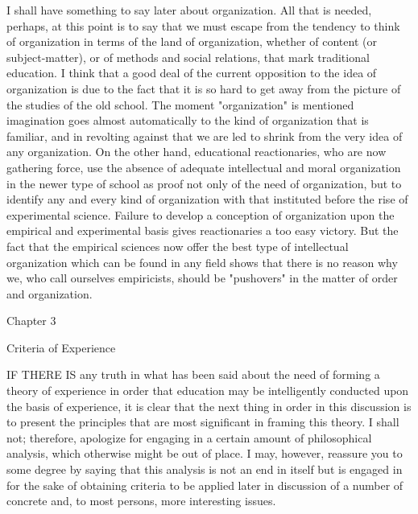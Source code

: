 I shall have something to say later about organization. All that is needed, perhaps, at 
this point is to say that we must escape from the tendency to think of organization in 
terms of the land of organization, whether of content (or subject-matter), or of methods 
and social relations, that mark traditional education. I think that a good deal of the current 
opposition to the idea of organization is due to the fact that it is so hard to get away from 
the picture of the studies of the old school. The moment "organization" is mentioned 
imagination goes almost automatically to the kind of organization that is familiar, and in 
revolting against that we are led to shrink from the very idea of any organization. On the 
other hand, educational reactionaries, who are now gathering force, use the absence of 
adequate intellectual and moral organization in the newer type of school as proof not only 
of the need of organization, but to identify any and every kind of organization with that 
instituted before the rise of experimental science. Failure to develop a conception of 
organization upon the empirical and experimental basis gives reactionaries a too easy 
victory. But the fact that the empirical sciences now offer the best type of intellectual 
organization which can be found in any field shows that there is no reason why we, who 
call ourselves empiricists, should be "pushovers" in the matter of order and organization. 


Chapter 3 

Criteria of Experience 

IF THERE IS any truth in what has been said about the need of forming a theory of 
experience in order that education may be intelligently conducted upon the basis of 
experience, it is clear that the next thing in order in this discussion is to present the 
principles that are most significant in framing this theory. I shall not; therefore, apologize 
for engaging in a certain amount of philosophical analysis, which otherwise might be out 
of place. I may, however, reassure you to some degree by saying that this analysis is not 
an end in itself but is engaged in for the sake of obtaining criteria to be applied later in 
discussion of a number of concrete and, to most persons, more interesting issues. 


